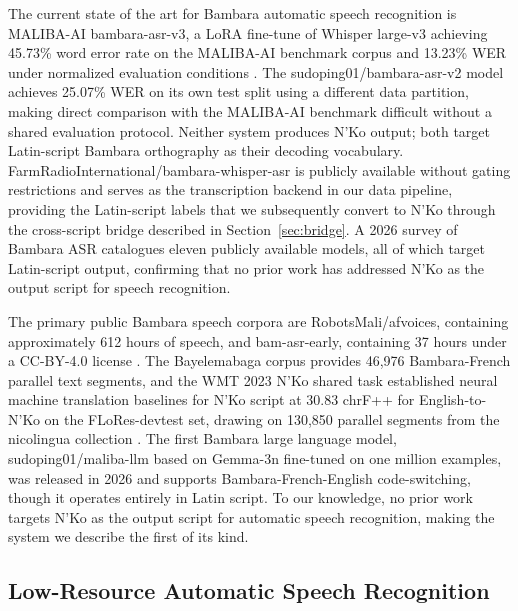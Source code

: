 \documentclass[11pt]{article}
\newcommand{\nko}{N'Ko}
\begin{document}
The current state of the art for Bambara automatic speech recognition is MALIBA-AI bambara-asr-v3, a LoRA fine-tune of Whisper large-v3 achieving 45.73\% word error rate on the MALIBA-AI benchmark corpus and 13.23\% WER under normalized evaluation conditions \cite{maliba2024bambara}. The sudoping01/bambara-asr-v2 model achieves 25.07\% WER on its own test split using a different data partition, making direct comparison with the MALIBA-AI benchmark difficult without a shared evaluation protocol. Neither system produces \nko{} output; both target Latin-script Bambara orthography as their decoding vocabulary. FarmRadioInternational/bambara-whisper-asr is publicly available without gating restrictions and serves as the transcription backend in our data pipeline, providing the Latin-script labels that we subsequently convert to \nko{} through the cross-script bridge described in Section~\ref{sec:bridge}. A 2026 survey of Bambara ASR \cite{bambara_survey_2026} catalogues eleven publicly available models, all of which target Latin-script output, confirming that no prior work has addressed \nko{} as the output script for speech recognition.

The primary public Bambara speech corpora are RobotsMali/afvoices, containing approximately 612 hours of speech, and bam-asr-early, containing 37 hours under a CC-BY-4.0 license \cite{robotsmali2024}. The Bayelemabaga corpus \cite{bayelemabaga2025} provides 46,976 Bambara-French parallel text segments, and the WMT 2023 \nko{} shared task \cite{wmt2023nko} established neural machine translation baselines for \nko{} script at 30.83 chrF++ for English-to-\nko{} on the FLoRes-devtest set, drawing on 130,850 parallel segments from the nicolingua collection \cite{doumbouya2021}. The first Bambara large language model, sudoping01/maliba-llm based on Gemma-3n fine-tuned on one million examples, was released in 2026 and supports Bambara-French-English code-switching, though it operates entirely in Latin script. To our knowledge, no prior work targets \nko{} as the output script for automatic speech recognition, making the system we describe the first of its kind.

\subsection{Low-Resource Automatic Speech Recognition}
\label{sec:related_lowresource}
\end{document}
